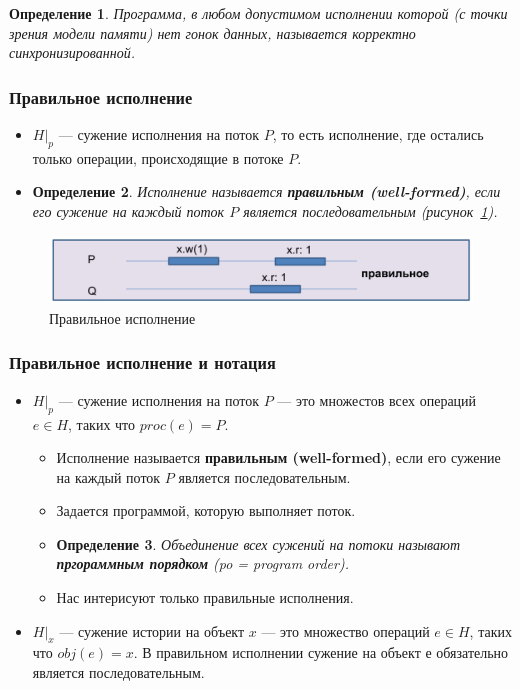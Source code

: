 \documentclass[10pt,a4paper,oneside,titlepage]{article}
\theoremstyle{plain}
\theoremstyle{defenition}
\newtheorem*{defenition}{Определение}
\begin{document}
\begin{defenition}
	Программа, в любом допустимом исполнении которой (с точки зрения модели памяти) нет гонок данных, называется корректно синхронизированной.
\end{defenition}

\subsubsection{Правильное исполнение} 
\begin{itemize}
	\item $H|_p$ --- сужение исполнения на поток $P$, то есть исполнение, где остались только операции, происходящие в потоке $P$.
	\item \begin{defenition}
		Исполнение называется {\bfseries правильным (well-formed)}, если его сужение на каждый поток $P$ является последовательным (рисунок~\ref{fig:model6}).
	\end{defenition} 
\end{itemize}
\begin{figure}
	\centering
	\includegraphics[width=0.5\linewidth]{pictures/Model6}
	\caption{Правильное исполнение}
	\label{fig:model6}
\end{figure}

\subsubsection{Правильное исполнение и нотация}
\begin{itemize}
	\item $H|_p$ --- сужение исполнения на поток $P$ --- это множестов всех операций $e\in H$, таких что $proc(e)=P$.
	\begin{itemize}
		\item Исполнение называется {\bfseries правильным (well-formed)}, если его сужение на каждый поток $P$ является последовательным.
		\item Задается программой, которую выполняет поток.
		\item \begin{defenition}
			Объединение всех сужений на потоки называют {\bfseries пргораммным порядком} (po = program order).
		\end{defenition}
	    \item Нас интерисуют только правильные исполнения.
	\end{itemize}
    \item $H|_x$ --- сужение истории на объект $x$ --- это множество операций $e\in H$, таких что $obj(e)=x$. В правильном исполнении сужение на объект е обязательно является последовательным.
\end{itemize}
\end{document}

